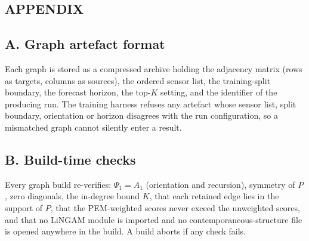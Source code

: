 \documentclass[MTech]{ugthesis}
\begin{document}
\begin{appendices}
\chapter*{APPENDIX}
\section*{A. Graph artefact format}
Each graph is stored as a compressed archive holding the adjacency matrix (rows as targets, columns as sources), the ordered sensor list, the training-split boundary, the forecast horizon, the top-$K$ setting, and the identifier of the producing run. The training harness refuses any artefact whose sensor list, split boundary, orientation or horizon disagrees with the run configuration, so a mismatched graph cannot silently enter a result.

\section*{B. Build-time checks}
Every graph build re-verifies: $\Psi_1 = A_1$ (orientation and recursion), symmetry of $P$, zero diagonals, the in-degree bound $K$, that each retained edge lies in the support of $P$, that the PEM-weighted scores never exceed the unweighted scores, and that no LiNGAM module is imported and no contemporaneous-structure file is opened anywhere in the build. A build aborts if any check fails.
\end{appendices}
  
\end{document}
